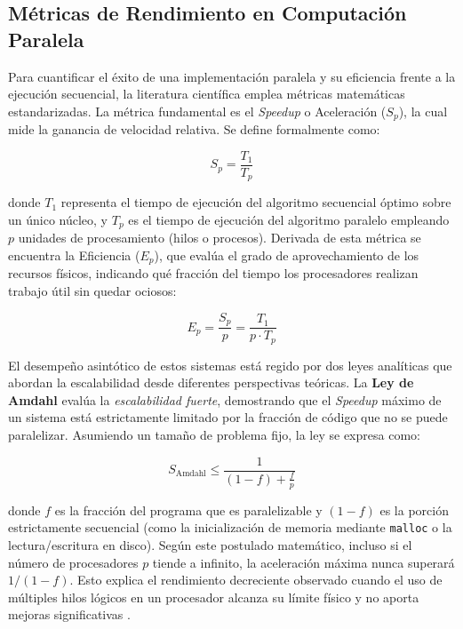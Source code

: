 \subsection{Métricas de Rendimiento en Computación Paralela}
Para cuantificar el éxito de una implementación paralela y su eficiencia frente a la ejecución secuencial, la literatura científica emplea métricas matemáticas estandarizadas. La métrica fundamental es el \textit{Speedup} o Aceleración (\(S_p\)), la cual mide la ganancia de velocidad relativa. Se define formalmente como:

\begin{equation}
    S_p = \frac{T_1}{T_p}
\end{equation}

donde \(T_1\) representa el tiempo de ejecución del algoritmo secuencial óptimo sobre un único núcleo, y \(T_p\) es el tiempo de ejecución del algoritmo paralelo empleando \(p\) unidades de procesamiento (hilos o procesos). Derivada de esta métrica se encuentra la Eficiencia (\(E_p\)), que evalúa el grado de aprovechamiento de los recursos físicos, indicando qué fracción del tiempo los procesadores realizan trabajo útil sin quedar ociosos:

\begin{equation}
    E_p = \frac{S_p}{p} = \frac{T_1}{p \cdot T_p}
\end{equation}

El desempeño asintótico de estos sistemas está regido por dos leyes analíticas que abordan la escalabilidad desde diferentes perspectivas teóricas. La \textbf{Ley de Amdahl} evalúa la \textit{escalabilidad fuerte}, demostrando que el \textit{Speedup} máximo de un sistema está estrictamente limitado por la fracción de código que no se puede paralelizar. Asumiendo un tamaño de problema fijo, la ley se expresa como:

\begin{equation}
    S_{\text{Amdahl}} \leq \frac{1}{(1 - f) + \frac{f}{p}}
\end{equation}

donde \(f\) es la fracción del programa que es paralelizable y \((1 - f)\) es la porción estrictamente secuencial (como la inicialización de memoria mediante \texttt{malloc} o la lectura/escritura en disco). Según este postulado matemático, incluso si el número de procesadores \(p\) tiende a infinito, la aceleración máxima nunca superará \(1 / (1 - f)\). Esto explica el rendimiento decreciente observado cuando el uso de múltiples hilos lógicos en un procesador alcanza su límite físico y no aporta mejoras significativas \parencite{Patterson2017Computer}.

